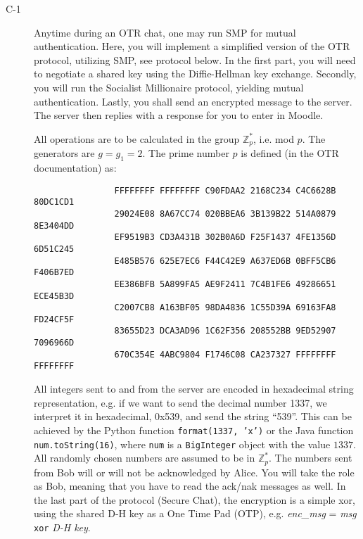 \documentclass{article}
\begin{document}
		\begin{description}
			\item[C-1]{Anytime during an OTR chat, one may run SMP for mutual authentication. Here, you will implement
				a simplified version of the OTR protocol, utilizing SMP, see protocol below. In the first part,
				you will need to negotiate a shared key using the Diffie-Hellman key exchange.
				Secondly, you will run the Socialist Millionaire protocol, yielding mutual authentication.
				Lastly, you shall send an encrypted message to the server. The server then replies with a response for you to enter in Moodle.
				
				All operations are to be calculated in the group $\mathbb{Z}_p^*$, i.e. mod $p$. The generators are $g = g_1 = 2$.
				The prime number $p$ is defined (in the OTR documentation) as:
				\begin{verbatim}
				FFFFFFFF FFFFFFFF C90FDAA2 2168C234 C4C6628B 80DC1CD1
				29024E08 8A67CC74 020BBEA6 3B139B22 514A0879 8E3404DD
				EF9519B3 CD3A431B 302B0A6D F25F1437 4FE1356D 6D51C245
				E485B576 625E7EC6 F44C42E9 A637ED6B 0BFF5CB6 F406B7ED
				EE386BFB 5A899FA5 AE9F2411 7C4B1FE6 49286651 ECE45B3D
				C2007CB8 A163BF05 98DA4836 1C55D39A 69163FA8 FD24CF5F
				83655D23 DCA3AD96 1C62F356 208552BB 9ED52907 7096966D
				670C354E 4ABC9804 F1746C08 CA237327 FFFFFFFF FFFFFFFF
				\end{verbatim}
				
				All integers sent to and from the server are encoded in hexadecimal string representation, e.g. if we
				want to send the decimal number 1337, we interpret it in hexadecimal, 0x539, and send the string ``539''. This can
				be achieved by the Python function \texttt{format(1337, 'x')} or the Java function \texttt{num.toString(16)}, where
				\texttt{num} is a \texttt{BigInteger} object with the value $1337$. All randomly chosen numbers are assumed to be in
				$\mathbb{Z}_p^*$. The numbers sent from Bob will or will not be acknowledged by Alice. You will take the role as Bob, meaning
				that you have to read the ack/nak messages as well. In the last part of the protocol (Secure Chat), the encryption
				is a simple xor, using the shared D-H key as a One Time Pad (OTP), e.g. 
				\emph{enc\_msg} = \emph{msg} \texttt{xor} \emph{D-H key}.
				
				\begin{sequencediagram}
					

\end{sequencediagram}}
\end{description}
\end{document}
